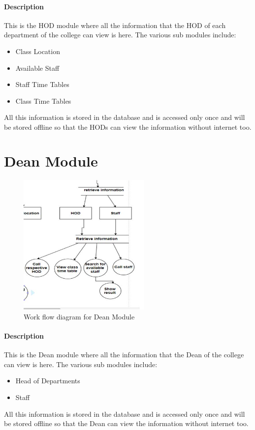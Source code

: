 \documentclass[BTech]{srmuthesis}
\begin{document}
\paragraph{Description}
This is the HOD module where all the information that the HOD of each department of the college can view is here. The various sub modules include:
\begin{itemize}
\item Class Location
\item Available Staff
\item Staff Time Tables
\item Class Time Tables
\end{itemize}
All this information is stored in the database and is accessed only once and will be stored offline so that the HODs can view the information without internet too.
\section{Dean Module}
\begin{figure}[htbp]
	\centering
	\includegraphics[width=\linewidth, height=7cm,keepaspectratio]{deanmodule}
	\caption{Work flow diagram for Dean Module}
	\label{fig:deanmodule}
\end{figure} 
\paragraph{Description}
This is the Dean module where all the information that the Dean of the college can view is here. The various sub modules include:
\begin{itemize}
\item Head of Departments
\item Staff
\end{itemize}
All this information is stored in the database and is accessed only once and will be stored offline so that the Dean can view the information without internet too.
\end{document}
